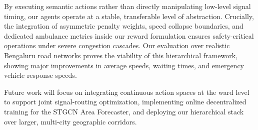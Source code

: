 \documentclass[conference]{IEEEtran}
\begin{document}
By executing semantic actions rather than directly manipulating low-level signal timing, our agents operate at a stable, transferable level of abstraction. Crucially, the integration of asymmetric penalty weights, speed collapse boundaries, and dedicated ambulance metrics inside our reward formulation ensures safety-critical operations under severe congestion cascades. Our evaluation over realistic Bengaluru road networks proves the viability of this hierarchical framework, showing major improvements in average speeds, waiting times, and emergency vehicle response speeds.

Future work will focus on integrating continuous action spaces at the ward level to support joint signal-routing optimization, implementing online decentralized training for the STGCN Area Forecaster, and deploying our hierarchical stack over larger, multi-city geographic corridors.



\end{document}

